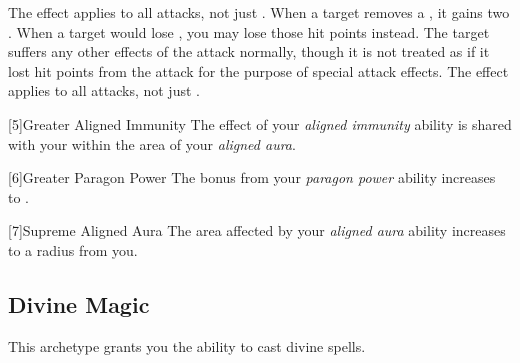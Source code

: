          The effect applies to all attacks, not just .
         When a target removes a , it gains two .
         When a target would lose , you may lose those hit points instead.
        The target suffers any other effects of the attack normally, though it is not treated as if it lost hit points from the attack for the purpose of special attack effects.
         The effect applies to all attacks, not just .

        [5]{Greater Aligned Immunity}
        The effect of your \textit{aligned immunity} ability is shared with your  within the area of your \textit{aligned aura}.

        [6]{Greater Paragon Power} The bonus from your \textit{paragon power} ability increases to .

        [7]{Supreme Aligned Aura}
        The area affected by your \textit{aligned aura} ability increases to a \gargarea radius  from you.



    \newpage
    \subsection{Divine Magic}
        This archetype grants you the ability to cast divine spells.

